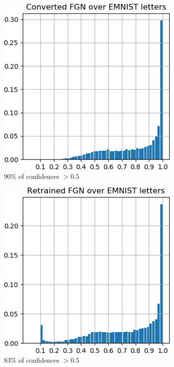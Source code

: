 \documentclass[12pt,oneside]{CUNY_PhD}
\begin{document}
\begin{figure}[!h]
\begin{subfigure}[t]{0.32\textwidth}
        \includegraphics[width=\textwidth]{images/mnist-behavior/converted-hist-emnist.png}
        \caption*{90\% of confidences $>0.5$}
    \end{subfigure}
    \begin{subfigure}[t]{0.32\textwidth}
        \includegraphics[width=\textwidth]{images/mnist-behavior/retrained-hist-emnist.png}
        \caption*{83\% of confidences $>0.5$}
    \end{subfigure}
    \caption{}
    \label{fig:hist-letters}
\end{figure}
\end{document}
